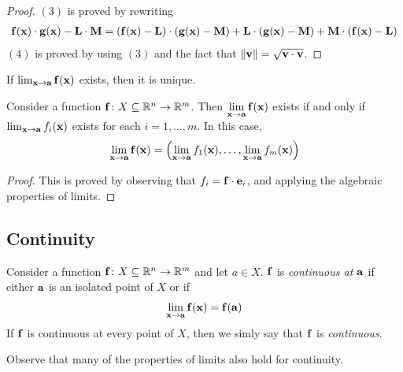 \documentclass{article}
\begin{document}
\begin{proof}
  $(3)$ is proved by rewriting
  \begin{align*}
    \mathbf{f}(\mathbf{x}) \cdot \mathbf{g}(\mathbf{x}) - \mathbf{L} \cdot \mathbf{M} = (\mathbf{f}(\mathbf{x}) - \mathbf{L}) \cdot (\mathbf{g}(\mathbf{x}) - \mathbf{M}) + \mathbf{L} \cdot (\mathbf{g}(\mathbf{x}) - \mathbf{M}) + \mathbf{M} \cdot (\mathbf{f}(\mathbf{x}) - \mathbf{L})
  \end{align*}
  $(4)$ is proved by using $(3)$ and the fact that $\norm{\mathbf{v}} = \sqrt{\mathbf{v} \cdot \mathbf{v}}$.
\end{proof}

\begin{theorem}
  If $\lim_{\mathbf{x} \to \mathbf{a}} \mathbf{f}(\mathbf{x})$ exists, then it is unique.
\end{theorem}

\begin{theorem}
  Consider a function $\mathbf{f} \colon X \subseteq \mathbb{R}^n \to \mathbb{R}^m$.
  Then $\lim\limits_{\mathbf{x} \to \mathbf{a}} \mathbf{f}(\mathbf{x})$ exists if and only if $\lim_{\mathbf{x} \to \mathbf{a}} f_i(\mathbf{x})$ exists for each $i = 1, \ldots, m$.
  In this case,
  \begin{align}
    \lim_{\mathbf{x} \to \mathbf{a}} \mathbf{f}(\mathbf{x}) = \left( \lim_{\mathbf{x} \to \mathbf{a}} f_1(\mathbf{x}), \ldots, \lim_{\mathbf{x} \to \mathbf{a}} f_m(\mathbf{x}) \right)
  \end{align}
\end{theorem}

\begin{proof}
  This is proved by observing that $f_i = \mathbf{f} \cdot \mathbf{e}_i$, and applying the algebraic properties of limits.
\end{proof}

\subsection{Continuity}

\begin{definition}[Continuity]
  Consider a function $\mathbf{f} \colon X \subseteq \mathbb{R}^n \to \mathbb{R}^m$ and let $a \in X$.
  $\mathbf{f}$ is \emph{continuous at $\mathbf{a}$} if either $\mathbf{a}$ is an isolated point of $X$ or if
  \begin{align}
    \lim_{\mathbf{x} \to \mathbf{a}} \mathbf{f}(\mathbf{x}) = \mathbf{f}(\mathbf{a})
  \end{align}
  If $\mathbf{f}$ is continuous at every point of $X$, then we simly say that $\mathbf{f}$ is \emph{continuous}.
\end{definition}
Observe that many of the properties of limits also hold for continuity.
\end{document}
